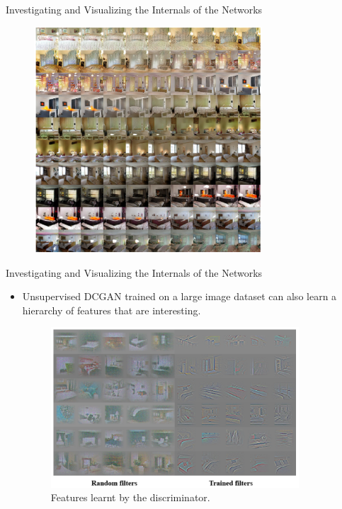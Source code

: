 \documentclass[10pt]{beamer}
\begin{document}
	\begin{frame}{Investigating and Visualizing the Internals of the Networks}
		\begin{figure}
			\includegraphics[width=23em]{figures/DCGAN-visualizing-internals-walking-in-latent.PNG}
		\end{figure}
	\end{frame}

	\begin{frame}{Investigating and Visualizing the Internals of the Networks}
		\begin{itemize}
			\item Unsupervised DCGAN trained on a large image dataset can also learn a hierarchy of features that are interesting.
			\onslide<2->
			\begin{figure}
				\includegraphics<2->[width=25em]{figures/DCGAN-visualizing-internals-filters.png}
				\caption{Features learnt by the discriminator.}
			\end{figure}
		\end{itemize}
	\end{frame}
\end{document}
